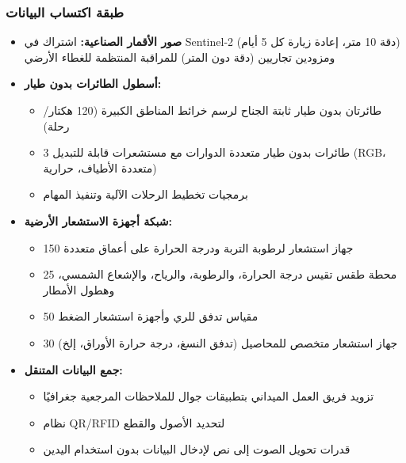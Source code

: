 \subsubsection{طبقة اكتساب البيانات}
\begin{itemize}
    \item \textbf{صور الأقمار الصناعية:} اشتراك في Sentinel-2 (دقة 10 متر، إعادة زيارة كل 5 أيام) ومزودين تجاريين (دقة دون المتر) للمراقبة المنتظمة للغطاء الأرضي
    
    \item \textbf{أسطول الطائرات بدون طيار:} 
    \begin{itemize}
        \item طائرتان بدون طيار ثابتة الجناح لرسم خرائط المناطق الكبيرة (120 هكتار/رحلة)
        \item 3 طائرات بدون طيار متعددة الدوارات مع مستشعرات قابلة للتبديل (RGB، متعددة الأطياف، حرارية)
        \item برمجيات تخطيط الرحلات الآلية وتنفيذ المهام
    \end{itemize}
    
    \item \textbf{شبكة أجهزة الاستشعار الأرضية:}
    \begin{itemize}
        \item 150 جهاز استشعار لرطوبة التربة ودرجة الحرارة على أعماق متعددة
        \item 25 محطة طقس تقيس درجة الحرارة، والرطوبة، والرياح، والإشعاع الشمسي، وهطول الأمطار
        \item 50 مقياس تدفق للري وأجهزة استشعار الضغط
        \item 30 جهاز استشعار متخصص للمحاصيل (تدفق النسغ، درجة حرارة الأوراق، إلخ)
    \end{itemize}
    
    \item \textbf{جمع البيانات المتنقل:}
    \begin{itemize}
        \item تزويد فريق العمل الميداني بتطبيقات جوال للملاحظات المرجعية جغرافيًا
        \item نظام QR/RFID لتحديد الأصول والقطع
        \item قدرات تحويل الصوت إلى نص لإدخال البيانات بدون استخدام اليدين
    \end{itemize}
\end{itemize}

